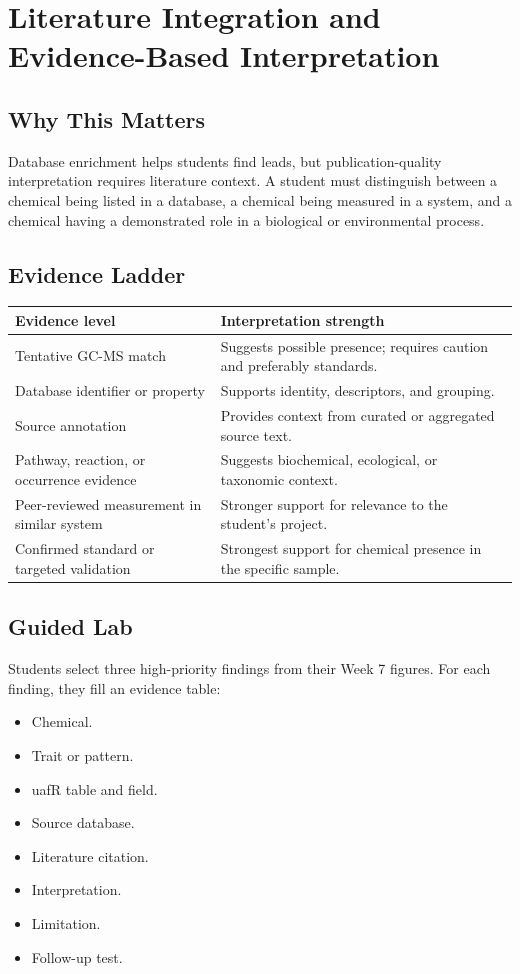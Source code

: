 \chapter{Literature Integration and Evidence-Based Interpretation}


\section{Why This Matters}
Database enrichment helps students find leads, but publication-quality interpretation requires literature context. A student must distinguish between a chemical being listed in a database, a chemical being measured in a system, and a chemical having a demonstrated role in a biological or environmental process.

\section{Evidence Ladder}
\begin{tabularx}{\textwidth}{p{}Y}
\toprule
\textbf{Evidence level} & \textbf{Interpretation strength}\\
\midrule
Tentative GC-MS match & Suggests possible presence; requires caution and preferably standards.\\
Database identifier or property & Supports identity, descriptors, and grouping.\\
Source annotation & Provides context from curated or aggregated source text.\\
Pathway, reaction, or occurrence evidence & Suggests biochemical, ecological, or taxonomic context.\\
Peer-reviewed measurement in similar system & Stronger support for relevance to the student's project.\\
Confirmed standard or targeted validation & Strongest support for chemical presence in the specific sample.\\
\bottomrule
\end{tabularx}

\section{Guided Lab}
Students select three high-priority findings from their Week 7 figures. For each finding, they fill an evidence table:
\begin{itemize}
  \item Chemical.
  \item Trait or pattern.
  \item uafR table and field.
  \item Source database.
  \item Literature citation.
  \item Interpretation.
  \item Limitation.
  \item Follow-up test.
\end{itemize}

